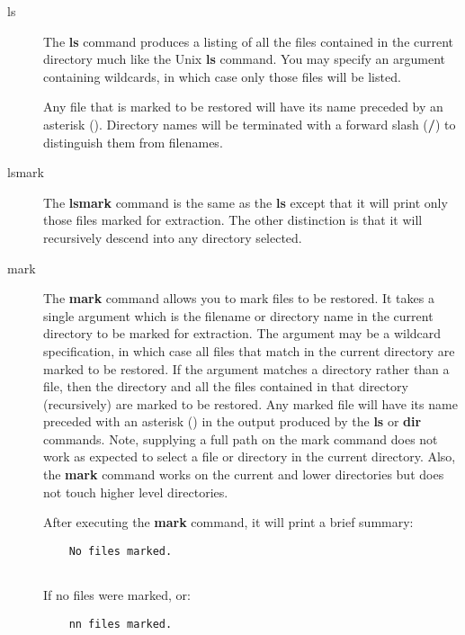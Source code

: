 \begin{description}
\item [ls]
   The {\bf ls} command produces a listing of all the files  contained in the
   current directory much like the Unix {\bf ls} command.  You may specify an
   argument containing wildcards, in which case only  those files will be
   listed.

   Any file that is marked to be restored will  have its name preceded by an
   asterisk ({\bf *}). Directory names  will be terminated with a forward slash
   ({\bf /}) to distinguish them  from filenames.  

\item [lsmark]
   The {\bf lsmark} command is the same as the  {\bf ls} except that it will
   print only those files marked for  extraction. The other distinction is that
   it will recursively  descend into any directory selected. 

\item [mark]
   The {\bf mark} command allows you to mark files to be restored. It takes a
   single argument which is the filename  or directory name in the current
   directory to be marked for extraction.  The argument may be a wildcard
   specification, in which  case all files that match in the current directory
   are marked to be  restored. If the argument matches a directory rather than a
   file,  then the directory and all the files contained in that directory
   (recursively)  are marked to be restored. Any marked file will have its name 
   preceded with an asterisk ({\bf *}) in the output produced by the  {\bf ls}
or
   {\bf dir} commands. Note, supplying a full path on  the mark command does not
   work as expected to select a file or  directory in the current directory.
   Also, the {\bf mark} command works  on the current and lower directories but
   does not touch higher level  directories.  

   After executing the {\bf mark} command, it will print a brief summary:  

\footnotesize
\begin{verbatim}
    No files marked.
    
\end{verbatim}
\normalsize

   If no files were marked, or:  

\footnotesize
\begin{verbatim}
    nn files marked.
    
\end{verbatim}
\normalsize


\end{description}
